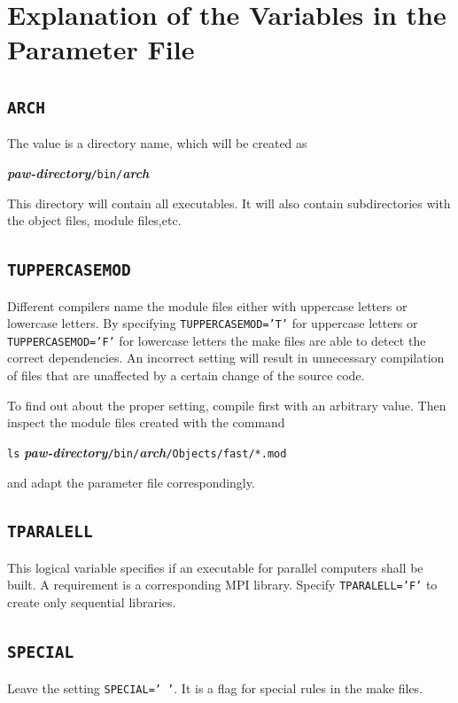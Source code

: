 \documentclass[a4paper,10pt]{report}
\newcommand{\myspec}[1]{\textbf{\textit{#1}}}
\newcommand{\mytt}[1]{{\tt #1}}
\begin{document}
\section{Explanation of the Variables in the  Parameter File}
\subsection{\mytt{ARCH}}
%
The value is a directory name, which will be created as
\begin{center}
\myspec{paw-directory}\mytt{/bin/}\myspec{arch}
\end{center}
This directory will contain all executables. It will also contain
subdirectories with the object files, module files,etc.

\subsection{\mytt{TUPPERCASEMOD}}

Different compilers name the module files either with uppercase
letters or lowercase letters. By specifying \mytt{TUPPERCASEMOD='T'}
for uppercase letters or \mytt{TUPPERCASEMOD='F'} for lowercase
letters the make files are able to detect the correct dependencies.
An incorrect setting will result in unnecessary compilation of files
that are unaffected by a certain change of the source code.

To find out about the proper setting, compile first with an arbitrary value.
Then inspect the module files created with the command
\begin{center}
\mytt{ls} \myspec{paw-directory}\mytt{/bin/}\myspec{arch}\mytt{/Objects/fast/*.mod}
\end{center}
and adapt the parameter file correspondingly.

\subsection{\mytt{TPARALELL}}
%
This logical variable specifies if an executable for parallel computers shall
be built.  A requirement is a corresponding MPI library.  Specify
\mytt{TPARALELL='F'} to create only sequential libraries.

\subsection{\mytt{SPECIAL}}
%
Leave the setting \mytt{SPECIAL=' '}. It is a flag for special rules
in the make files.
\end{document}
